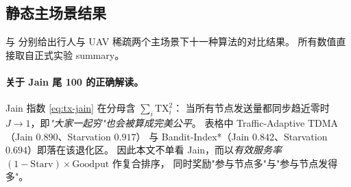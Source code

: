 \subsection{静态主场景结果}
\label{subsec:static-results}

 与 
分别给出行人与 UAV 稀疏两个主场景下十一种算法的对比结果。
所有数值直接取自正式实验 summary。

\paragraph{关于 Jain 尾 100 的正确解读。}
Jain 指数 \eqref{eq:tx-jain} 在分母含 \(\sum_i\mathrm{TX}_i^2\)：
当所有节点发送量都同步趋近零时 \(J\to 1\)，即\emph{"大家一起穷"也会被算成完美公平}。
表格中 Traffic-Adaptive TDMA（Jain \(0.890\)、Starvation \(0.917\)）
与 Bandit-Index*（Jain \(0.842\)、Starvation \(0.694\)）即落在该退化区。
因此本文不单看 Jain，而以\emph{有效服务率}~\((1-\mathrm{Starv})\times\mathrm{Goodput}\)
作复合排序，
同时奖励"参与节点多"与"参与节点发得多"。

